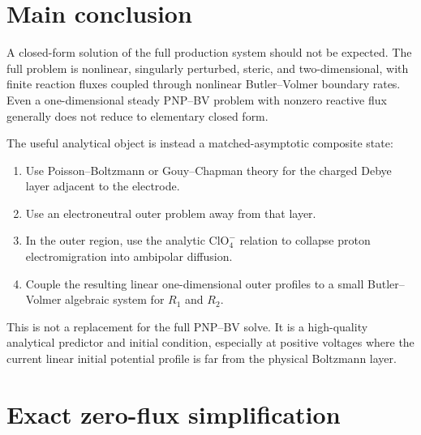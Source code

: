 \documentclass[11pt]{article}
\newcommand{\ClO}{\mathrm{ClO}_4^{-}}
\begin{document}
\section{Main conclusion}

A closed-form solution of the full production system should not be expected.
The full problem is nonlinear, singularly perturbed, steric, and
two-dimensional, with finite reaction fluxes coupled through nonlinear
Butler--Volmer boundary rates. Even a one-dimensional steady PNP--BV problem
with nonzero reactive flux generally does not reduce to elementary closed
form.

The useful analytical object is instead a matched-asymptotic composite state:
\begin{enumerate}
  \item Use Poisson--Boltzmann or Gouy--Chapman theory for the charged Debye
        layer adjacent to the electrode.
  \item Use an electroneutral outer problem away from that layer.
  \item In the outer region, use the analytic \(\ClO\) relation to collapse
        proton electromigration into ambipolar diffusion.
  \item Couple the resulting linear one-dimensional outer profiles to a small
        Butler--Volmer algebraic system for \(R_1\) and \(R_2\).
\end{enumerate}
This is not a replacement for the full PNP--BV solve. It is a high-quality
analytical predictor and initial condition, especially at positive voltages
where the current linear initial potential profile is far from the physical
Boltzmann layer.

\section{Exact zero-flux simplification}
\end{document}
